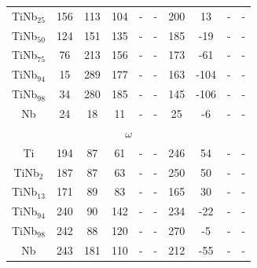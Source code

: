 \begin{longtable}[H]{ c c c c c c c c c c }
	TiNb$_{25}$ & 156 & 113 & 104 & - & - & 200 & 13 & - & - \\
	TiNb$_{50}$ & 124 & 151 & 135 & - & - & 185 & -19 & - & - \\
	TiNb$_{75}$ & 76 & 213 & 156 & - & - & 173 & -61 & - & - \\
	TiNb$_{94}$ & 15 & 289 & 177 & - & - & 163 & -104 & - & - \\
	TiNb$_{98}$ & 34 & 280 & 185 & - & - & 145 & -106 & - & - \\
	Nb & 24 & 18 & 11 & - & - & 25 & -6 & - & - \\
	\hline
	\multicolumn{10}{c}{$\omega$}\\
	Ti & 194 & 87 & 61 & - & - & 246 & 54 & - & - \\
	TiNb$_{2}$ & 187 & 87 & 63 & - & - & 250 & 50 & - & - \\
	TiNb$_{13}$ & 171 & 89 & 83 & - & - & 165 & 30 & - & - \\
	TiNb$_{94}$ & 240 & 90 & 142 & - & - & 234 & -22 & - & - \\
	TiNb$_{98}$ & 242 & 88 & 120 & - & - & 270 & -5 & - & - \\
	Nb & 243 & 181 & 110 & - & - & 212 & -55 & - & - \\
	\hline
\end{longtable}

